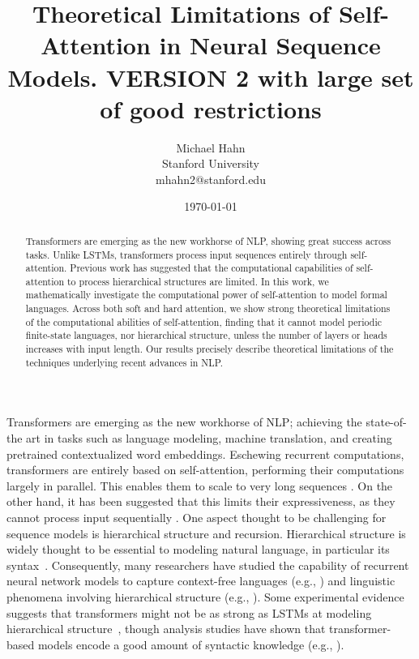 \documentclass[11pt,a4paper]{article}
\title{Theoretical Limitations of Self-Attention in Neural Sequence Models. VERSION 2 with large set of good restrictions}
\author{Michael Hahn \\ Stanford University \\ mhahn2@stanford.edu}
\date{\today}
\begin{document}
\maketitle
\begin{abstract}
Transformers are emerging as the new workhorse of NLP, showing great success across tasks.
Unlike LSTMs, transformers process input sequences entirely through self-attention.
Previous work has suggested that the computational capabilities of self-attention to process hierarchical structures are limited.
In this work, we mathematically investigate the computational power of self-attention to model formal languages.
Across both soft and hard attention, we show strong theoretical limitations of the computational abilities of self-attention, finding that it cannot model periodic finite-state languages, nor hierarchical structure, unless the number of layers or heads increases with input length.
Our results precisely describe theoretical limitations of the techniques underlying recent advances in NLP.
\end{abstract}


Transformers are emerging as the new workhorse of NLP; achieving the state-of-the art in tasks such as language modeling, machine translation, and creating pretrained contextualized word embeddings.
Eschewing recurrent computations, transformers are entirely based on self-attention, performing their computations largely in parallel.
This enables them to scale to very long sequences \cite{vaswani2017attention,dai2019transformer,child2019generating}.
On the other hand, it has been suggested that this limits their expressiveness, as they cannot process input sequentially \cite{tran2018importance,dehghani2018universal,shen2018disan,chen2018best,hao2019modeling}.
One aspect thought to be challenging for sequence models is hierarchical structure and recursion.
Hierarchical structure is widely thought to be essential to modeling natural language, in particular its syntax~\cite{everaert2015structures}.
Consequently, many researchers have studied the capability of recurrent neural network models to capture context-free languages (e.g., \citet{kalinke1998computation,gers2001lstm,gruning2006stack,weiss2018practical,sennhauser2018evaluating,korsky2019computational}) and linguistic phenomena involving hierarchical structure (e.g., \citet{linzen2016assessing,gulordava2018colorless}).
Some experimental evidence suggests that transformers might not be as strong as LSTMs at modeling hierarchical structure~\cite{tran2018importance}, though analysis studies have shown that transformer-based models encode a good amount of syntactic knowledge (e.g., \citet{clark2019bert,lin2019open,tenney2019bert}).
\end{document}
